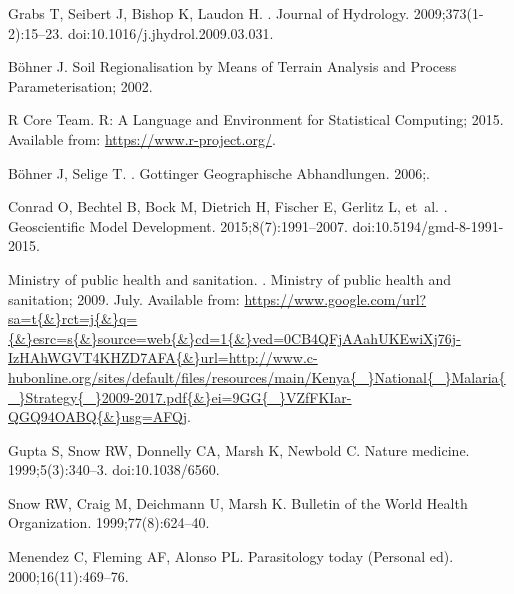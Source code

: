 \documentclass[10pt,letterpaper]{article}\usepackage[]{graphicx}\usepackage[]{color}
\begin{document}
\begin{thebibliography}{10}
Grabs T, Seibert J, Bishop K, Laudon H.
.
\newblock Journal of Hydrology. 2009;373(1-2):15--23.
\newblock doi:{10.1016/j.jhydrol.2009.03.031}.

B{\"{o}}hner J. {Soil Regionalisation by Means of Terrain Analysis and Process
  Parameterisation}; 2002.

{R Core Team}. {R: A Language and Environment for Statistical Computing}; 2015.
\newblock Available from: \url{https://www.r-project.org/}.

B{\"{o}}hner J, Selige T.
.
\newblock Gottinger Geographische Abhandlungen. 2006;.

Conrad O, Bechtel B, Bock M, Dietrich H, Fischer E, Gerlitz L, et~al.
.
\newblock Geoscientific Model Development. 2015;8(7):1991--2007.
\newblock doi:{10.5194/gmd-8-1991-2015}.

Ministry of public health and sanitation.
.
\newblock Ministry of public health and sanitation; 2009. July.
\newblock Available from:
  \url{https://www.google.com/url?sa=t{\&}rct=j{\&}q={\&}esrc=s{\&}source=web{\&}cd=1{\&}ved=0CB4QFjAAahUKEwiXj76j-IzHAhWGVT4KHZD7AFA{\&}url=http://www.c-hubonline.org/sites/default/files/resources/main/Kenya{\_}National{\_}Malaria{\_}Strategy{\_}2009-2017.pdf{\&}ei=9GG{\_}VZfFKIar-QGQ94OABQ{\&}usg=AFQj}.

Gupta S, Snow RW, Donnelly CA, Marsh K, Newbold C.
\newblock Nature medicine. 1999;5(3):340--3.
\newblock doi:{10.1038/6560}.

Snow RW, Craig M, Deichmann U, Marsh K.
\newblock Bulletin of the World Health Organization. 1999;77(8):624--40.

Menendez C, Fleming AF, Alonso PL.
\newblock Parasitology today (Personal ed). 2000;16(11):469--76.

\end{thebibliography}
\end{document}
